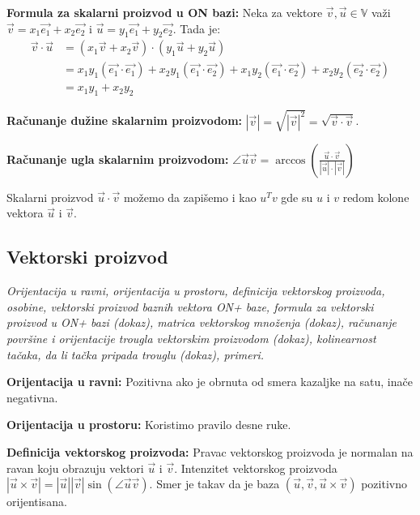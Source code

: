 \documentclass[12pt]{article}
\newcommand{\vek}[1]{\overrightarrow{#1}}
\begin{document}
\textbf{Formula za skalarni proizvod u ON bazi:} Neka za vektore $\vek{v},
    \vek{u}\in\mathbb{V}$ važi $\vek{v}=x_1\vek{e_1}+x_2\vek{e_2}$ i
$\vek{u}=y_1\vek{e_1}+y_2\vek{e_2}$. Tada je:
\begin{align*}
    \vek{v}\cdot\vek{u} & = (x_1\vek{v}+x_2\vek{v})\cdot(y_1\vek{u}+y_2\vek{u})                                                                             \\
                        & = x_1y_1(\vek{e_1}\cdot\vek{e_1})+x_2y_1(\vek{e_1}\cdot\vek{e_2})+x_1y_2(\vek{e_1}\cdot\vek{e_2})+x_2y_2(\vek{e_2}\cdot\vek{e_2}) \\
                        & = x_1y_1+x_2y_2
\end{align*}
\par

\textbf{Računanje dužine skalarnim proizvodom:} $|\vek{v}|=\sqrt{|\vek{v}|^2}=
    \sqrt{\vek{v}\cdot\vek{v}}$.
\par

\textbf{Računanje ugla skalarnim proizvodom:} $\angle{\vek{u}\vek{v}}=
    \arccos(\frac{\vek{u}\cdot\vek{v}}{|\vek{u}|\cdot|\vek{v}|})$
\par

Skalarni proizvod $\vek{u}\cdot\vek{v}$ možemo da zapišemo i kao $u^Tv$ gde su
$u$ i $v$ redom kolone vektora $\vek{u}$ i $\vek{v}$.
\par

\subsection{Vektorski proizvod}
\textit{Orijentacija u ravni, orijentacija u prostoru, definicija vektorskog
    proizvoda, osobine, vektorski proizvod baznih vektora ON+ baze, formula za
    vektorski proizvod u ON+ bazi (dokaz), matrica vektorskog množenja (dokaz),
    računanje površine i orijentacije trougla vektorskim proizvodom (dokaz),
    kolinearnost tačaka, da li tačka pripada trouglu (dokaz), primeri.}
\par
\vspace*{1cm}

\textbf{Orijentacija u ravni:} Pozitivna ako je obrnuta od smera kazaljke na
satu, inače negativna.
\par

\textbf{Orijentacija u prostoru:} Koristimo pravilo desne ruke.
\par

\textbf{Definicija vektorskog proizvoda:} Pravac vektorskog proizvoda je
normalan na ravan koju obrazuju vektori $\vek{u}$ i $\vek{v}$. Intenzitet
vektorskog proizvoda $|\vek{u}\times\vek{v}|=|\vek{u}||\vek{v}|
    \sin(\angle{\vek{u}\vek{v}})$. Smer je takav da je baza
$(\vek{u},\vek{v},\vek{u}\times\vek{v})$ pozitivno orijentisana.
\par
\end{document}
